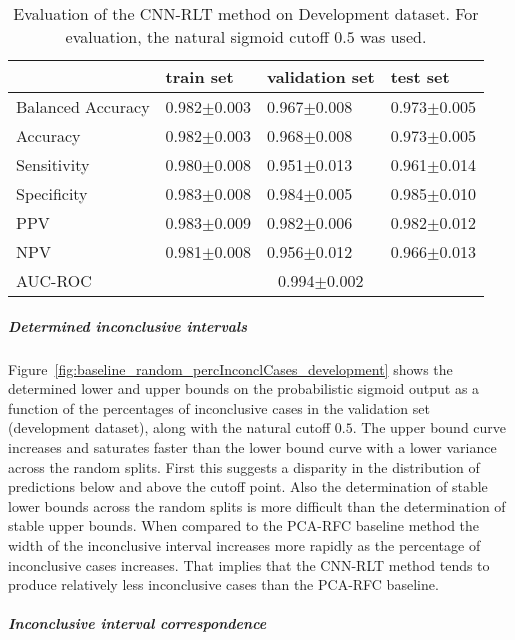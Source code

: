 \begin{table}[ht]
  \caption{Evaluation of the CNN-RLT method on Development dataset. 
  For evaluation, the natural sigmoid cutoff $0.5$ was used.}
  \centering
  \begin{tabular}{llll}
      \hline
                        & train set         & validation set      & test set             \\
      \hline
      Balanced Accuracy & 0.982$\pm$0.003   &  0.967$\pm$0.008    &  0.973$\pm$0.005  \\
      Accuracy          & 0.982$\pm$0.003    &   0.968$\pm$0.008   &  0.973$\pm$0.005  \\
      Sensitivity       &  0.980$\pm$0.008  &   0.951$\pm$0.013  &  0.961$\pm$0.014 \\
      Specificity       &   0.983$\pm$0.008   &   0.984$\pm$0.005  &   0.985$\pm$0.010 \\
      PPV               &  0.983$\pm$0.009   &   0.982$\pm$0.006   &  0.982$\pm$0.012   \\
      NPV               &  0.981$\pm$0.008   &   0.956$\pm$0.012   & 0.966$\pm$0.013  \\
      \hline
      AUC-ROC          &  \multicolumn{3}{c}{0.994$\pm$0.002}  \\
      \hline
  \end{tabular}
 \label{t1:cnn_rlt_perf_eval_table}
\end{table}


\subparagraph{Determined inconclusive intervals}

Figure~\ref{fig:baseline_random_percInconclCases_development} shows the determined lower and upper bounds on the 
probabilistic sigmoid output as a function of the percentages of inconclusive cases 
in the validation set (development dataset), along with the natural cutoff $0.5$.
The upper bound curve increases and saturates faster than the lower bound curve with a lower variance across 
the random splits.
First this suggests a disparity in the distribution of predictions below and above the cutoff point.
Also the determination of stable lower bounds across the random splits is more difficult
than the determination of stable upper bounds.
When compared to the PCA-RFC baseline method 
the width of the inconclusive interval increases more rapidly as the percentage of inconclusive cases increases.
That implies that the CNN-RLT method tends to produce relatively less inconclusive cases than the PCA-RFC baseline.

\subparagraph{Inconclusive interval correspondence}

